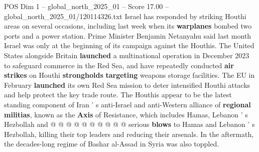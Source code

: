 \begin{textsample}{POS Dim 1 – global\_north\_2025\_01 – Score 17.00 – global\_north\_2025\_01/120114326.txt}
Israel has responded by striking Houthi areas on several occasions, including last week when its \textbf{warplanes} bombed two ports and a power station.
Prime Minister Benjamin Netanyahu said last month Israel was only at the beginning of its campaign against the Houthis.
The United States alongside Britain \textbf{launched} a multinational operation in December 2023 to safeguard commerce in the Red Sea, and have repeatedly conducted \textbf{air} \textbf{strikes} on Houthi \textbf{strongholds} \textbf{targeting} weapons storage facilities.
The EU in February \textbf{launched} its own Red Sea mission to deter intensified Houthi attacks and help protect the key trade route.
The Houthis appear to be the latest standing component of Iran ' s anti-Israel and anti-Western alliance of \textbf{regional} \textbf{militias}, known as the \textbf{Axis} of Resistance, which includes Hamas, Lebanon ' s Hezbollah and @ @ @ @ @ @ @ @ @ @ serious \textbf{blows} to Hamas and Lebanon ' s Hezbollah, killing their top leaders and reducing their arsenals.
In the aftermath, the decades-long regime of Bashar al-Assad in Syria was also toppled.

\end{textsample}
